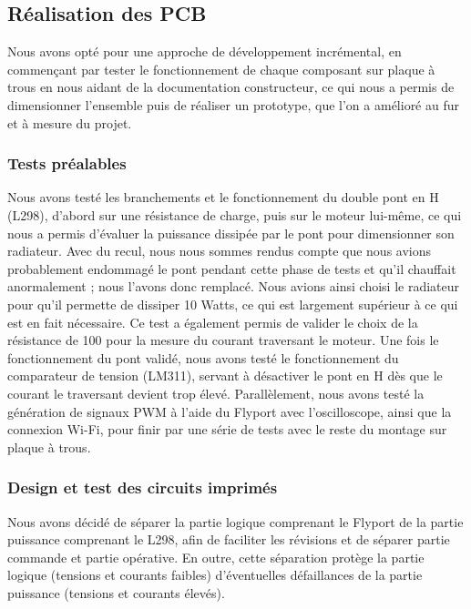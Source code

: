 \documentclass[a4paper,12pt]{report}
\begin{document}
		\subsection{Réalisation des  PCB}
		Nous avons opté pour une approche de développement incrémental, en commençant par tester le fonctionnement de chaque composant sur plaque à trous en nous aidant de la documentation constructeur, ce qui nous a permis de dimensionner l’ensemble puis de réaliser un prototype, que l’on a amélioré au fur et à mesure du projet.
		
			\subsubsection{Tests préalables}
			Nous avons testé les branchements et le fonctionnement du double pont en H (L298), d’abord sur une résistance de charge, puis sur le moteur lui-même, ce qui nous a permis d’évaluer la puissance dissipée par le pont pour dimensionner son radiateur. Avec du recul, nous nous sommes rendus compte que nous avions probablement endommagé le pont pendant cette phase de tests et qu’il chauffait anormalement ; nous l’avons donc remplacé. Nous avions ainsi choisi le radiateur pour qu’il permette de dissiper 10 Watts, ce qui est largement supérieur à ce qui est en fait nécessaire. Ce test a également permis de valider le choix de la résistance de \unit{100}{\milli \ohm} pour la mesure du courant traversant le moteur.
Une fois le fonctionnement du pont validé, nous avons testé le fonctionnement du comparateur de tension (LM311), servant à désactiver le pont en H dès que le courant le traversant devient trop élevé.
Parallèlement, nous avons testé la génération de signaux PWM à l’aide du Flyport avec l’oscilloscope, ainsi que la connexion Wi-Fi, pour finir par une série de tests avec le reste du montage sur plaque à trous.
			
			\subsubsection{Design et test des circuits imprimés}
			Nous avons décidé de séparer la partie logique comprenant le Flyport de la partie puissance comprenant le L298, afin de faciliter les révisions et de séparer partie commande et partie opérative. En outre, cette séparation protège la partie logique (tensions et courants faibles) d’éventuelles défaillances de la partie puissance (tensions et courants élevés).
			
\end{document}
